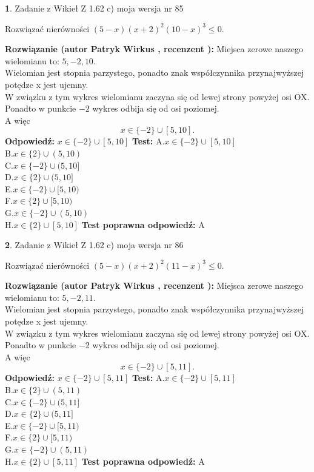 \documentclass[12pt, a4paper]{article}
\theoremstyle{definition} %
\newtheorem{zad}{}
\newcommand{\zadStart}[1]{\begin{zad}#1\newline}
\newcommand{\zadStop}{\end{zad}}
\newcommand{\rozwStart}[2]{\noindent \textbf{Rozwiązanie (autor #1 , recenzent #2): }\newline}
\newcommand{\rozwStop}{\newline}
\newcommand{\odpStart}{\noindent \textbf{Odpowiedź:}\newline}
\newcommand{\odpStop}{\newline}
\newcommand{\testStart}{\noindent \textbf{Test:}\newline}
\newcommand{\testStop}{\newline}
\newcommand{\kluczStart}{\noindent \textbf{Test poprawna odpowiedź:}\newline}
\newcommand{\kluczStop}{\newline}
\begin{document}
\zadStart{Zadanie z Wikieł Z 1.62 c) moja wersja nr 85}

Rozwiązać nierówności $(5-x)(x+2)^{2}(10-x)^{3}\le0$.
\zadStop
\rozwStart{Patryk Wirkus}{}
Miejsca zerowe naszego wielomianu to: $5, -2, 10$.\\
Wielomian jest stopnia parzystego, ponadto znak współczynnika przy\linebreak najwyższej potędze x jest ujemny.\\ W związku z tym wykres wielomianu zaczyna się od lewej strony powyżej osi OX.\\
Ponadto w punkcie $-2$ wykres odbija się od osi poziomej.\\
A więc $$x \in \{-2\} \cup [5,10].$$
\rozwStop
\odpStart
$x \in \{-2\} \cup [5,10]$
\odpStop
\testStart
A.$x \in \{-2\} \cup [5,10]$\\
B.$x \in \{2\} \cup (5,10)$\\
C.$x \in \{-2\} \cup (5,10]$\\
D.$x \in \{2\} \cup (5,10]$\\
E.$x \in \{-2\} \cup [5,10)$\\
F.$x \in \{2\} \cup [5,10)$\\
G.$x \in \{-2\} \cup (5,10)$\\
H.$x \in \{2\} \cup [5,10]$
\testStop
\kluczStart
A
\kluczStop



\zadStart{Zadanie z Wikieł Z 1.62 c) moja wersja nr 86}

Rozwiązać nierówności $(5-x)(x+2)^{2}(11-x)^{3}\le0$.
\zadStop
\rozwStart{Patryk Wirkus}{}
Miejsca zerowe naszego wielomianu to: $5, -2, 11$.\\
Wielomian jest stopnia parzystego, ponadto znak współczynnika przy\linebreak najwyższej potędze x jest ujemny.\\ W związku z tym wykres wielomianu zaczyna się od lewej strony powyżej osi OX.\\
Ponadto w punkcie $-2$ wykres odbija się od osi poziomej.\\
A więc $$x \in \{-2\} \cup [5,11].$$
\rozwStop
\odpStart
$x \in \{-2\} \cup [5,11]$
\odpStop
\testStart
A.$x \in \{-2\} \cup [5,11]$\\
B.$x \in \{2\} \cup (5,11)$\\
C.$x \in \{-2\} \cup (5,11]$\\
D.$x \in \{2\} \cup (5,11]$\\
E.$x \in \{-2\} \cup [5,11)$\\
F.$x \in \{2\} \cup [5,11)$\\
G.$x \in \{-2\} \cup (5,11)$\\
H.$x \in \{2\} \cup [5,11]$
\testStop
\kluczStart
A
\kluczStop
\end{document}

